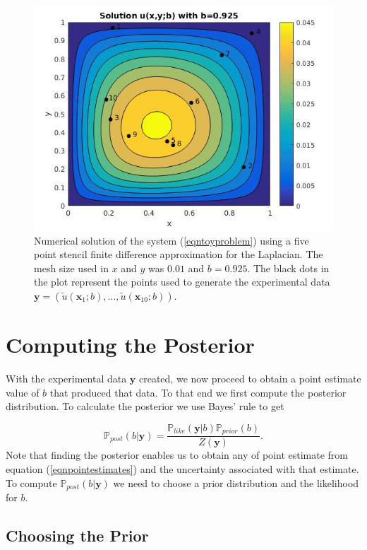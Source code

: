 \documentclass{sfuthesis}
\newcommand{\post}{\mathbb{P}_{post}}
\newcommand{\like}{\mathbb{P}_{like}}
\newcommand{\prior}{\mathbb{P}_{prior}}
\newcommand{\x}{\textbf{x}}
\newcommand{\y}{\textbf{y}}
\begin{document}
\begin{figure}[H]
\centering
\includegraphics[scale=0.5]{./FigChap3/solu}
\caption{Numerical solution of the system (\ref{eqntoyproblem}) using a five point stencil finite difference
approximation for the Laplacian. The mesh
size used in $x$ and $y$ was $0.01$ and $b=0.925$. The black dots
in the plot represent the points used to generate the experimental data 
$\y=(\tilde{u}(\x_{1};b),\ldots,\tilde{u}(\x_{10};b))$.}
\label{figsolU}
\end{figure}


\section{Computing the Posterior}
With the experimental data $\y$ created, we now proceed to obtain a point estimate value of $b$ that produced that data. 
To that end
we first compute the posterior distribution.
To calculate the posterior we use Bayes' rule to get

\begin{equation} \label{eqnpropto}
\post(b|\y)=\frac{\like(\y|b)\prior(b)}{Z(\y)}.
\end{equation}
Note that finding the posterior enables us to obtain   any of point
estimate from equation (\ref{eqnpointestimates}) and the uncertainty associated with that estimate.
To compute $\post(b|\y)$ we need to choose
a prior distribution and the likelihood for $b$. 

\subsection{Choosing the Prior}
\end{document}

